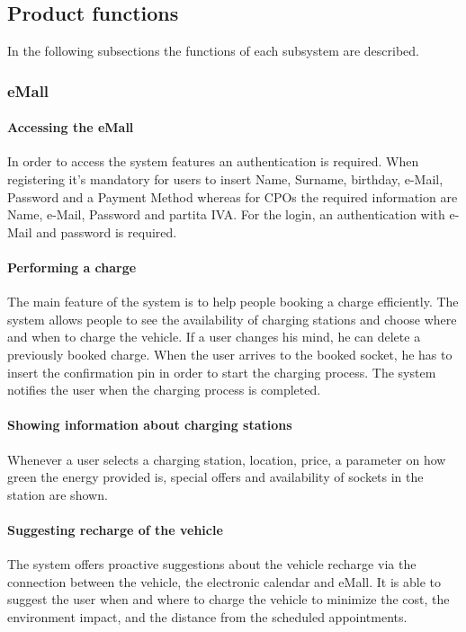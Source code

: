 \subsection{Product functions}
In the following subsections the functions of each subsystem are described.

\subsubsection{\acf{eMall}}
\paragraph{Accessing the \ac{eMall}}
In order to access the system features an authentication is required. When registering it's mandatory for users to insert Name, Surname, birthday, e-Mail, Password and a Payment Method whereas for \acp{CPO} the required information are Name, e-Mail, Password and \gls{partita IVA}. For the login, an authentication with e-Mail and password is required.

\paragraph{Performing a charge}
The main feature of the system is to help people booking a charge efficiently. The system allows people to see the availability of charging stations and choose where and when to charge the vehicle.
If a user changes his mind, he can delete a previously booked charge.
When the user arrives to the booked socket, he has to insert the confirmation pin in order to start the charging process.
The system notifies the user when the charging process is completed.

\paragraph{Showing information about charging stations}
Whenever a user selects a charging station, location, price, a parameter on how green the energy provided is, special offers and availability of sockets in the station are shown.

\paragraph{Suggesting recharge of the vehicle}
The system offers proactive suggestions about the vehicle recharge via the connection between the vehicle, the electronic calendar and \ac{eMall}. It is able to suggest the user when and where to charge the vehicle to minimize the cost, the environment impact, and the distance from the scheduled appointments.

